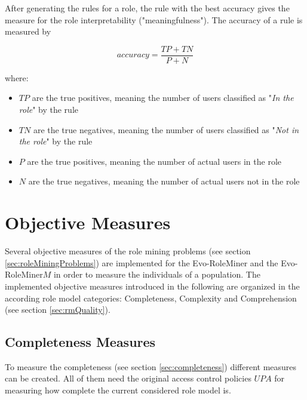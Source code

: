     After generating the rules for a role, the rule with the best accuracy gives the measure for the role interpretability ("meaningfulness"). The accuracy of a rule is measured by
    
    \begin{equation}
    accuracy = \frac{TP+TN}{P+N}
    \end{equation}
    
    where:
    
    \begin{itemize}
    	\item $TP$ are the true positives, meaning the number of users classified as "\textit{In the role}" by the rule
    	\item $TN$ are the true negatives, meaning the number of users classified as "\textit{Not in the role}" by the rule
    	\item $P$ are the true positives, meaning the number of actual users in the role
    	\item $N$ are the true negatives, meaning the number of actual users not in the role
    \end{itemize}
        
    \section{Objective Measures}
    \label{sec:objectiveMeasure}
    Several objective measures of the role mining problems (see section \ref{sec:roleMiningProblems}) are implemented for the Evo-RoleMiner and the Evo-RoleMiner$M$ in order to measure the individuals of a population. The implemented objective measures introduced in the following are organized in the according role model categories: Completeness, Complexity and Comprehension (see section \ref{sec:rmQuality}).
    
    \subsection{Completeness Measures}
    \label{sec:optimizationCompleteness}
    To measure the completeness (see section \ref{sec:completeness}) different measures can be created. All of them need the original access control policies $UPA$ for measuring how complete the current considered role model is.
    
